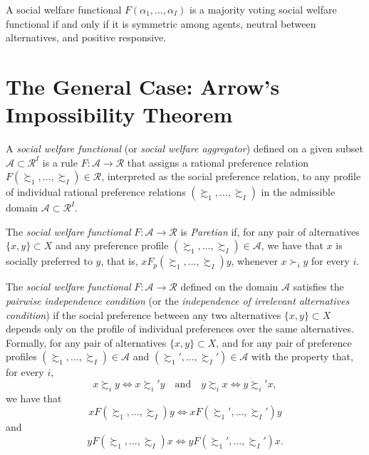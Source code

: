 \begin{prop}
    A social welfare functional $F(\alpha_1, \dots, \alpha_I)$ is a majority voting social welfare functional if and only if it is symmetric among agents, neutral between alternatives, and positive responsive.
\end{prop}


\section{The General Case: Arrow's Impossibility Theorem}

\begin{defn}
    A \emph{social welfare functional} (or \emph{social welfare aggregator}) defined on a given subset $\mathscr{A} \subset \mathscr{R}^I$ is a rule $F: \mathscr{A} \to \mathscr{R}$ that assigns a rational preference relation $F(\succsim_1, \dots, \succsim_I) \in \mathscr{R}$, interpreted as the social preference relation, to any profile of individual rational preference relations $(\succsim_1, \dots, \succsim_I)$ in the admissible domain $\mathscr{A} \subset \mathscr{R}^I$.
\end{defn}

\begin{defn}
    The \emph{social welfare functional} $F: \mathscr{A} \to \mathscr{R}$ is \emph{Paretian} if, for any pair of alternatives $\{x, y\} \subset X$ and any preference profile $(\succsim_1, \dots, \succsim_I) \in \mathscr{A}$, we have that $x$ is socially preferred to $y$, that is, $x F_p (\succsim_1, \dots, \succsim_I) y$, whenever $x \succ_i y$ for every $i$.
\end{defn}

\begin{defn}
    The \emph{social welfare functional} $F: \mathscr{A} \to \mathscr{R}$ defined on the domain $\mathscr{A}$ satisfies the \emph{pairwise independence condition} (or the \emph{independence of irrelevant alternatives condition}) if the social preference between any two alternatives $\{x, y\} \subset X$ depends only on the profile of individual preferences over the same alternatives. Formally, for any pair of alternatives $\{x, y\} \subset X$, and for any pair of preference profiles $(\succsim_1, \dots, \succsim_I) \in \mathscr{A}$ and $(\succsim_1', \dots, \succsim_I') \in \mathscr{A}$ with the property that, for every $i$, 
    \begin{equation*}
        x \succsim_i y \iff x \succsim_i' y \quad \text{and} \quad y \succsim_i x \iff y \succsim_i' x,
    \end{equation*}
    we have that
    \begin{equation*}
        x F (\succsim_1, \dots, \succsim_I) y \iff x F (\succsim_1', \dots, \succsim_I') y
    \end{equation*}
    and
    \begin{equation*}
        y F (\succsim_1, \dots, \succsim_I) x \iff y F (\succsim_1', \dots, \succsim_I') x.
    \end{equation*}
\end{defn}


